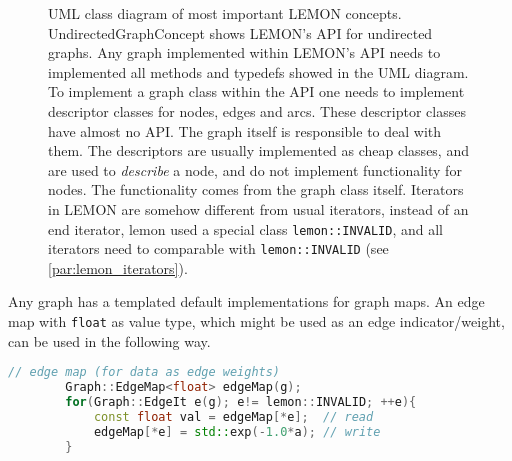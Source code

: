 \begin{figure}[H]
\begin{center}
    \end{center}
    \caption{
        UML class diagram of most important LEMON concepts.
        UndirectedGraphConcept shows LEMON's API for undirected 
        graphs. Any graph implemented within LEMON's API 
        needs to implemented all methods and typedefs showed 
        in the UML diagram.
        To implement a graph class within the API one needs 
        to implement descriptor classes for nodes, edges and arcs.
        These descriptor classes have almost no API.
        The graph itself is responsible to deal with them.
        The descriptors are usually implemented as cheap classes,
        and are used to \emph{describe} a node, and do not implement
        functionality for nodes.
        The functionality comes from the graph class itself.
        Iterators in LEMON are somehow different from usual 
        iterators, instead of an end iterator, lemon used a special
        class \lstinline{lemon::INVALID}, and all iterators
        need to comparable with \lstinline{lemon::INVALID} (see \cref{par:lemon_iterators}).
    }\label{fig:uml_lemon_graph_concepts}
    \end{figure}






        Any graph has a templated default implementations for graph maps.
        An edge map with \lstinline{float} as value type, which might
        be used as an edge indicator/weight, can be 
        used in the following way.

        \begin{lstlisting}[language=c++]
        // edge map (for data as edge weights)
        Graph::EdgeMap<float> edgeMap(g); 
        for(Graph::EdgeIt e(g); e!= lemon::INVALID; ++e){
            const float val = edgeMap[*e];  // read
            edgeMap[*e] = std::exp(-1.0*a); // write
        }
        \end{lstlisting}


